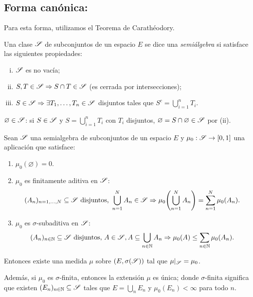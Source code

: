 \subsection{Forma canónica:}

Para esta forma, utilizamos el Teorema de Carathéodory.
\begin{definition}
	Una clase \(\mathscr{S}\) de subconjuntos de un espacio \(E\) se dice una \textit{semiálgebra} si satisface las siguientes propiedades:
	\begin{enumerate}[i)]
		\item \(\mathscr{S}\) es no vacía;

        \item \(S, T \in \mathscr{S} \Rightarrow S \cap T \in \mathscr{S}\) (es cerrada por intersecciones);

		\item \(S \in \mathscr{S} \Rightarrow \exists T_1, \dots, T_n \in \mathscr{S}\) disjuntos tales que \(S^{c} = \bigcup_{i=1}^n T_i\).
    \end{enumerate}
\end{definition}

\begin{remark}
	\(\varnothing \in \mathscr{S}\): si \(S \in \mathscr{S}\) y \(S = \bigcup_{i=1}^n T_i\) con \(T_i\) disjuntos, \(\varnothing = S \cap \varnothing \in \mathscr{S}\) por (ii).
\end{remark}

\begin{theorem}
	Sean \(\mathscr{S}\) una semialgebra de subconjuntos de un espacio \(E\) y \(\mu_0: \mathscr{S} \to [0,1]\) una aplicación que satisface:
    \begin{enumerate}
		\item[S0)] \(\mu_0(\varnothing) = 0\).

		\item[S1)] \(\mu_0\) es finitamente aditiva en \(\mathscr{S}\):
        \[
        (A_n)_{n=1,\dots,N} \subseteq \mathscr{S} \text{ disjuntos, } \bigcup_{n=1}^N A_n \in \mathscr{S} \Rightarrow \mu_0\!\left(\bigcup_{n=1}^N A_n\right) = \sum_{n=1}^N \mu_0(A_n).
        \]

		\item[S2)] \(\mu_0\) es \(\sigma\)-subaditiva en \(\mathscr{S}\):
        \[
        (A_n)_{n\in\mathbb{N}} \subseteq \mathscr{S} \text{ disjuntos, } A \in \mathscr{S}, A \subseteq \bigcup_{n\in\mathbb{N}} A_n \Rightarrow \mu_0(A) \leq \sum_{n\in\mathbb{N}} \mu_0(A_n).
        \]
    \end{enumerate}
    Entonces existe una medida \(\mu\) sobre \((E, \sigma(\mathscr{S}))\) tal que \(\mu|_{\mathscr{S}} = \mu_0\).
    \par
    Además, si \(\mu_0\) es \(\sigma\)-finita, entonces la extensión \(\mu\) es única; donde $\sigma$-finita significa que existen \((E_n)_{n\in\mathbb{N}} \subseteq \mathscr{S}\) tales que \(E = \bigcup_n E_n\) y \(\mu_0(E_n) < \infty\) para todo \(n\).
\end{theorem}

